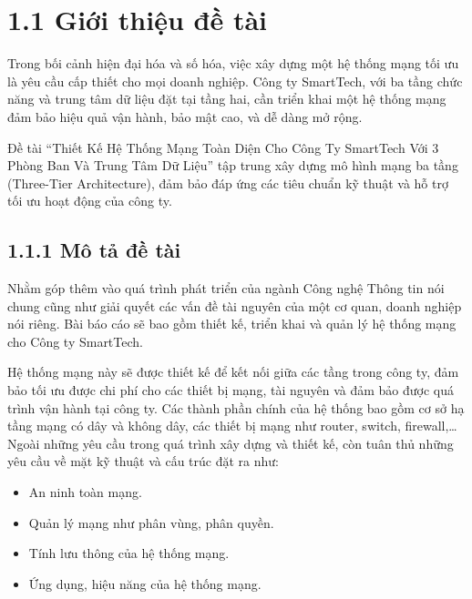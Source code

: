 \section*{1.1 Giới thiệu đề tài}

Trong bối cảnh hiện đại hóa và số hóa, việc xây dựng một hệ thống mạng tối ưu là yêu cầu cấp thiết cho mọi doanh nghiệp. Công ty SmartTech, với ba tầng chức năng và trung tâm dữ liệu đặt tại tầng hai, cần triển khai một hệ thống mạng đảm bảo hiệu quả vận hành, bảo mật cao, và dễ dàng mở rộng.

Đề tài “Thiết Kế Hệ Thống Mạng Toàn Diện Cho Công Ty SmartTech Với 3 Phòng Ban Và Trung Tâm Dữ Liệu” tập trung xây dựng mô hình mạng ba tầng (Three-Tier Architecture), đảm bảo đáp ứng các tiêu chuẩn kỹ thuật và hỗ trợ tối ưu hoạt động của công ty.

\subsection*{1.1.1 Mô tả đề tài}

Nhằm góp thêm vào quá trình phát triển của ngành Công nghệ Thông tin nói chung cũng như giải quyết các vấn đề tài nguyên của một cơ quan, doanh nghiệp nói riêng. Bài báo cáo sẽ bao gồm thiết kế, triển khai và quản lý hệ thống mạng cho Công ty SmartTech. 

Hệ thống mạng này sẽ được thiết kế để kết nối giữa các tầng trong công ty, đảm bảo tối ưu được chi phí cho các thiết bị mạng, tài nguyên và đảm bảo được quá trình vận hành tại công ty. Các thành phần chính của hệ thống bao gồm cơ sở hạ tầng mạng có dây và không dây, các thiết bị mạng như router, switch, firewall,… Ngoài những yêu cầu trong quá trình xây dựng và thiết kế, còn tuân thủ những yêu cầu về mặt kỹ thuật và cấu trúc đặt ra như:

\begin{itemize}[left = 2.5cm]
    \item An ninh toàn mạng.
    \item Quản lý mạng như phân vùng, phân quyền.
    \item Tính lưu thông của hệ thống mạng.
    \item Ứng dụng, hiệu năng của hệ thống mạng.
\end{itemize}



